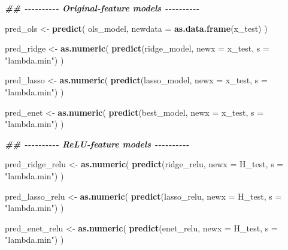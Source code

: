 \documentclass[
  11pt,
]{article}
\newenvironment{Shaded}{\begin{snugshade}}{\end{snugshade}}
\newcommand{\AttributeTok}[1]{\textcolor[rgb]{0.13,0.29,0.53}{#1}}
\newcommand{\DocumentationTok}[1]{\textcolor[rgb]{0.56,0.35,0.01}{\textbf{\textit{#1}}}}
\newcommand{\FunctionTok}[1]{\textcolor[rgb]{0.13,0.29,0.53}{\textbf{#1}}}
\newcommand{\NormalTok}[1]{#1}
\newcommand{\OtherTok}[1]{\textcolor[rgb]{0.56,0.35,0.01}{#1}}
\newcommand{\StringTok}[1]{\textcolor[rgb]{0.31,0.60,0.02}{#1}}
\begin{document}
\begin{Shaded}
\begin{Highlighting}[]
\DocumentationTok{\#\# {-}{-}{-}{-}{-}{-}{-}{-}{-}{-} Original{-}feature models {-}{-}{-}{-}{-}{-}{-}{-}{-}{-}}

\NormalTok{pred\_ols }\OtherTok{\textless{}{-}} \FunctionTok{predict}\NormalTok{(}
\NormalTok{  ols\_model,}
  \AttributeTok{newdata =} \FunctionTok{as.data.frame}\NormalTok{(x\_test)}
\NormalTok{)}

\NormalTok{pred\_ridge }\OtherTok{\textless{}{-}} \FunctionTok{as.numeric}\NormalTok{(}
  \FunctionTok{predict}\NormalTok{(ridge\_model, }\AttributeTok{newx =}\NormalTok{ x\_test, }\AttributeTok{s =} \StringTok{"lambda.min"}\NormalTok{)}
\NormalTok{)}

\NormalTok{pred\_lasso }\OtherTok{\textless{}{-}} \FunctionTok{as.numeric}\NormalTok{(}
  \FunctionTok{predict}\NormalTok{(lasso\_model, }\AttributeTok{newx =}\NormalTok{ x\_test, }\AttributeTok{s =} \StringTok{"lambda.min"}\NormalTok{)}
\NormalTok{)}

\NormalTok{pred\_enet }\OtherTok{\textless{}{-}} \FunctionTok{as.numeric}\NormalTok{(}
  \FunctionTok{predict}\NormalTok{(best\_model, }\AttributeTok{newx =}\NormalTok{ x\_test, }\AttributeTok{s =} \StringTok{"lambda.min"}\NormalTok{)}
\NormalTok{)}

\DocumentationTok{\#\# {-}{-}{-}{-}{-}{-}{-}{-}{-}{-} ReLU{-}feature models {-}{-}{-}{-}{-}{-}{-}{-}{-}{-}}

\NormalTok{pred\_ridge\_relu }\OtherTok{\textless{}{-}} \FunctionTok{as.numeric}\NormalTok{(}
  \FunctionTok{predict}\NormalTok{(ridge\_relu, }\AttributeTok{newx =}\NormalTok{ H\_test, }\AttributeTok{s =} \StringTok{"lambda.min"}\NormalTok{)}
\NormalTok{)}

\NormalTok{pred\_lasso\_relu }\OtherTok{\textless{}{-}} \FunctionTok{as.numeric}\NormalTok{(}
  \FunctionTok{predict}\NormalTok{(lasso\_relu, }\AttributeTok{newx =}\NormalTok{ H\_test, }\AttributeTok{s =} \StringTok{"lambda.min"}\NormalTok{)}
\NormalTok{)}

\NormalTok{pred\_enet\_relu }\OtherTok{\textless{}{-}} \FunctionTok{as.numeric}\NormalTok{(}
  \FunctionTok{predict}\NormalTok{(enet\_relu, }\AttributeTok{newx =}\NormalTok{ H\_test, }\AttributeTok{s =} \StringTok{"lambda.min"}\NormalTok{)}
\NormalTok{)}


\end{Highlighting}
\end{Shaded}
\end{document}
